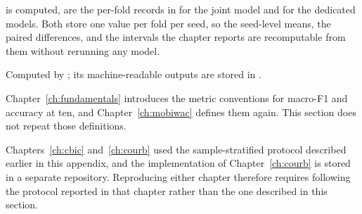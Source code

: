 \begin{description}
        is computed, are the per-fold records in
         for the joint model
        and  for the dedicated
        models. Both store one value per fold per seed, so the seed-level means, the paired
        differences, and the intervals the chapter reports are recomputable from them
        without rerunning any model.
  \item[The label-history benchmark.] Computed by
        ; its
        machine-readable outputs are stored in
        .
\end{description}

Chapter~\ref{ch:fundamentals} introduces the metric conventions for macro-F1 and
accuracy at ten, and Chapter~\ref{ch:mobiwac} defines them again. This section does not
repeat those definitions.

Chapters~\ref{ch:cbic} and~\ref{ch:courb} used the sample-stratified protocol described
earlier in this appendix, and the implementation of Chapter~\ref{ch:courb} is stored in
a separate repository. Reproducing either chapter therefore requires following the
protocol reported in that chapter rather than the one described in this section.
